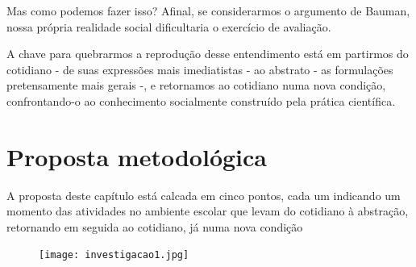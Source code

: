 Mas como podemos fazer isso? Afinal, se considerarmos o argumento de Bauman, nossa própria realidade social dificultaria o exercício de avaliação.

A chave para quebrarmos a reprodução desse entendimento está em partirmos do cotidiano - de suas expressões mais imediatistas - ao abstrato - as formulações pretensamente mais gerais -, e retornamos ao cotidiano numa nova condição, confrontando-o ao conhecimento socialmente construído pela prática científica.

\section{Proposta metodológica}

A proposta deste capítulo está calcada em cinco pontos, cada um indicando um momento das atividades no ambiente escolar que levam do cotidiano à abstração, retornando em seguida ao cotidiano, já numa nova condição

\begin{figure}[H]
\label{etapas-metodologicas}
\centering
\texttt{[image: investigacao1.jpg]}

\end{figure}

